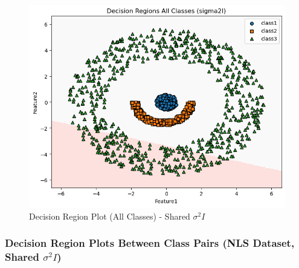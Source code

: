 \begin{figure}[H]
    \centering
    \includegraphics[width=\linewidth]{images/NLS_Group04_images/01_sigma2i/05_decision_region_all.png}
    \caption{Decision Region Plot (All Classes) - Shared $\sigma^2 I$}
\end{figure}

\subsubsection{Decision Region Plots Between Class Pairs (NLS Dataset, Shared $\sigma^2 I$)}

